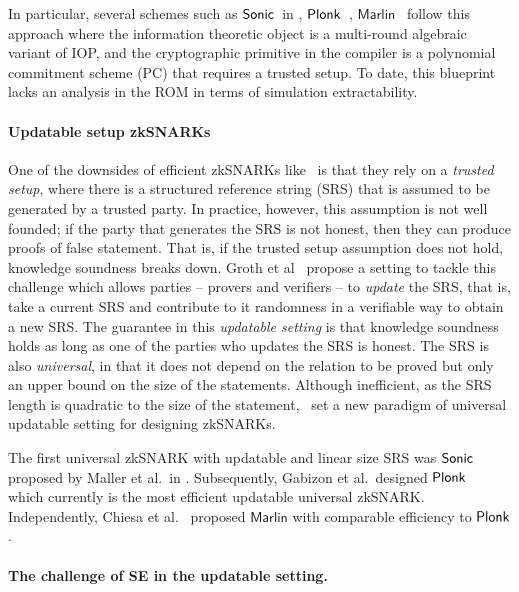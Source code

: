 In particular, several schemes such as
${\textnormal{\textsf{Sonic}}}$~in \cite{CCS:MBKM19}, $\textnormal{\textsf{Plonk}}$~\cite{EPRINT:GabWilCio19}, $\textsf{Marlin}$~\cite{EC:CHMMVW20} 
follow this approach where the information theoretic object is a multi-round algebraic variant of IOP, and the cryptographic primitive in the compiler is a polynomial commitment scheme (PC) that requires a trusted setup. To date, this blueprint lacks an analysis in the ROM in terms of simulation extractability.


\paragraph{Updatable setup zkSNARKs}
One of the downsides of efficient zkSNARKs like~\cite{AC:Groth10a,TCC:Lipmaa12,EC:GGPR13,SP:PHGR13,AC:Lipmaa13,AC:DFGK14,EC:Groth16} is that they rely on a \textit{trusted setup}, where there is a structured reference string (SRS) that is assumed to be generated by a trusted party. In practice, however, this assumption is not well founded; if the party that generates the SRS is not honest, then they can produce proofs of false statement. That is, if the trusted setup assumption does not hold, knowledge soundness breaks down.
Groth et al~\cite{C:GKMMM18} propose a setting to tackle this challenge which allows parties -- provers and verifiers -- to \emph{update} the SRS, that is, take a current SRS and contribute to it randomness in a verifiable way to obtain a new SRS. The guarantee in this \textit{updatable setting} is that knowledge soundness holds as long as one of the parties who updates the SRS is honest. The SRS is also \emph{universal}, in that it does not depend on the relation to be proved but only an upper bound on the size of the statements.
Although inefficient, as the SRS length is quadratic to the size of the statement,~\cite{C:GKMMM18} set a new
paradigm of universal updatable setting for designing zkSNARKs.

The first universal zkSNARK with updatable and linear size SRS was
${\textnormal{\textsf{Sonic}}}$ proposed by Maller et al.~in \cite{CCS:MBKM19}. Subsequently, Gabizon et
al.~designed $\textnormal{\textsf{Plonk}}$~\cite{EPRINT:GabWilCio19} which currently is the
most efficient updatable universal zkSNARK. Independently, Chiesa et
al.~\cite{EC:CHMMVW20} proposed $\textsf{Marlin}$ with comparable efficiency to
$\textnormal{\textsf{Plonk}}$.

\paragraph{The challenge of SE in the updatable setting.}

